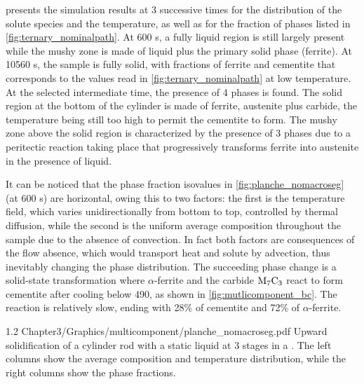  presents the simulation results at 3 successive times for the distribution of the solute species and the temperature, as 
well as for the fraction of phases listed in \cref{fig:ternary_nominalpath}. At 600 s, a fully liquid region is still largely present while the mushy zone is 
made of liquid plus the primary solid phase (ferrite). At \num{10560} s, the sample is fully solid, with fractions of ferrite and cementite that 
corresponds to the values read in \cref{fig:ternary_nominalpath} at low temperature. At the selected intermediate time, the presence of 4 phases is found. The 
solid region at the bottom of the cylinder is made of ferrite, austenite plus carbide, the temperature being still too high to permit the 
cementite to form. The mushy zone above the solid region is characterized by the presence of 3 phases due to a peritectic reaction taking 
place that progressively transforms ferrite into austenite in the presence of liquid. 

It can be noticed that the phase fraction isovalues 
in \cref{fig:planche_nomacroseg} (at 600 s) are horizontal, owing this to two factors: the first is the temperature field, which varies unidirectionally from 
bottom to top, controlled by thermal diffusion, while the second is the uniform average composition throughout the sample due to the absence 
of convection. In fact both factors are consequences of the flow absence, which would transport heat and solute by advection, thus inevitably 
changing the phase distribution. The succeeding phase change is a solid-state transformation where $\alpha$-ferrite and the carbide $\text{M}_7 \text{C}_3$ react to form 
cementite after cooling below \SI{490}{\udegC}, as shown in \cref{fig:mutlicomponent_bc}. The reaction is relatively slow, ending with 28\% 
of cementite and 72\% of $\alpha$-ferrite.

\begin{landscape}
\begin{figureth}
{1.2}
{Chapter3/Graphics/multicomponent/planche_nomacroseg.pdf}
{Upward solidification of a cylinder rod with a static liquid at 
3 stages in a . The left columns show the average 
composition and temperature distribution, while the right columns show the phase fractions.}
\label{fig:planche_nomacroseg}
\end{figureth}
\end{landscape}

